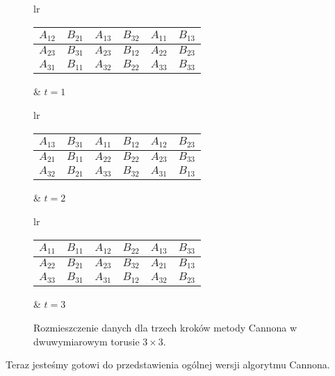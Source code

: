 \begin{figure}[H]
\centering
\begin{tabular}{lr}
\begin{tabular}{|cc|cc|cc|}
\hline
\(A_{12}\) & \(B_{21}\) & \(A_{13}\) & \(B_{32}\) & \(A_{11}\) & \(B_{13}\) \\
\hline
\(A_{23}\) & \(B_{31}\) & \(A_{23}\) & \(B_{12}\) & \(A_{22}\) & \(B_{23}\) \\
\hline
\(A_{31}\) & \(B_{11}\) & \(A_{32}\) & \(B_{22}\) & \(A_{33}\) & \(B_{33} \) \\
\hline
\end{tabular} &
\hspace{1cm}\(t=1\)
\end{tabular}
\vspace{0.5cm}

\begin{tabular}{lr}
\begin{tabular}{|cc|cc|cc|}
\hline
\(A_{13}\) & \(B_{31}\) & \(A_{11}\) & \(B_{12}\) & \(A_{12}\) & \(B_{23}\) \\
\hline
\(A_{21}\) & \(B_{11}\) & \(A_{22}\) & \(B_{22}\) & \(A_{23}\) & \(B_{33}\) \\
\hline
\(A_{32}\) & \(B_{21}\) & \(A_{33}\) & \(B_{32}\) & \(A_{31}\) & \(B_{13} \) \\
\hline
\end{tabular} &
\hspace{1cm}\(t=2\)
\end{tabular}
\vspace{0.5cm}

\begin{tabular}{lr}
\begin{tabular}{|cc|cc|cc|}
\hline
\(A_{11}\) & \(B_{11}\) & \(A_{12}\) & \(B_{22}\) & \(A_{13}\) & \(B_{33}\) \\
\hline
\(A_{22}\) & \(B_{21}\) & \(A_{23}\) & \(B_{32}\) & \(A_{21}\) & \(B_{13}\) \\
\hline
\(A_{33}\) & \(B_{31}\) & \(A_{31}\) & \(B_{12}\) & \(A_{32}\) & \(B_{23} \) \\
\hline
\end{tabular} &
\hspace{1cm}\(t=3\)
\end{tabular}
\caption{Rozmieszczenie danych dla trzech kroków metody Cannona w dwuwymiarowym torusie \(3\times 3\).}
\label{fig:cannon_last_one}
\end{figure}

Teraz jesteśmy gotowi do przedstawienia ogólnej wersji algorytmu Cannona. 

